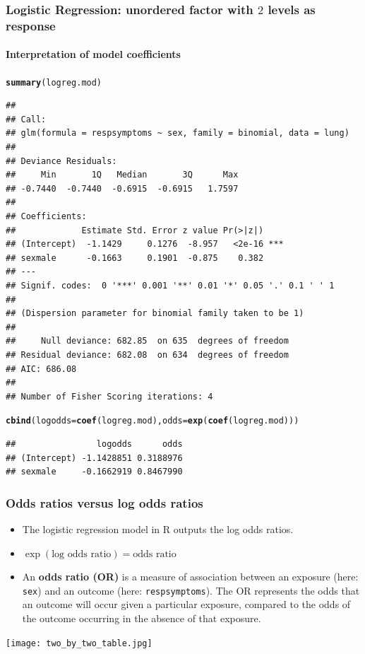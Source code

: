 \documentclass{beamer}\usepackage[]{graphicx}\usepackage[]{color}
\makeatletter
\newcommand{\hlstd}[1]{\textcolor[rgb]{0.345,0.345,0.345}{#1}}%
\newcommand{\hlkwc}[1]{\textcolor[rgb]{0.333,0.667,0.333}{#1}}%
\newcommand{\hlkwd}[1]{\textcolor[rgb]{0.737,0.353,0.396}{\textbf{#1}}}%
\newenvironment{kframe}{%
 \def\at@end@of@kframe{}%
 \ifinner\ifhmode%
  \def\at@end@of@kframe{\end{minipage}}%
  \begin{minipage}{\columnwidth}%
 \fi\fi%
 \def\FrameCommand##1{\hskip\@totalleftmargin \hskip-\fboxsep
 \colorbox{shadecolor}{##1}\hskip-\fboxsep
     \hskip-\linewidth \hskip-\@totalleftmargin \hskip\columnwidth}%
 \MakeFramed {\advance\hsize-\width
   \@totalleftmargin\z@ \linewidth\hsize
   \@setminipage}}%
 {\par\unskip\endMakeFramed%
 \at@end@of@kframe}
\newenvironment{knitrout}{}{} %
\makeatother
\begin{document}
{{{
\begin{frame}[fragile]
\frametitle{Logistic Regression: unordered factor with $2$ levels as response}
\framesubtitle{Interpretation of model coefficients}
\begin{knitrout}\tiny
{}\color{fgcolor}\begin{kframe}
\begin{alltt}
\hlkwd{summary}\hlstd{(logreg.mod)}
\end{alltt}
\begin{verbatim}
## 
## Call:
## glm(formula = respsymptoms ~ sex, family = binomial, data = lung)
## 
## Deviance Residuals: 
##     Min       1Q   Median       3Q      Max  
## -0.7440  -0.7440  -0.6915  -0.6915   1.7597  
## 
## Coefficients:
##             Estimate Std. Error z value Pr(>|z|)    
## (Intercept)  -1.1429     0.1276  -8.957   <2e-16 ***
## sexmale      -0.1663     0.1901  -0.875    0.382    
## ---
## Signif. codes:  0 '***' 0.001 '**' 0.01 '*' 0.05 '.' 0.1 ' ' 1
## 
## (Dispersion parameter for binomial family taken to be 1)
## 
##     Null deviance: 682.85  on 635  degrees of freedom
## Residual deviance: 682.08  on 634  degrees of freedom
## AIC: 686.08
## 
## Number of Fisher Scoring iterations: 4
\end{verbatim}
\begin{alltt}
\hlkwd{cbind}\hlstd{(}\hlkwc{logodds} \hlstd{=} \hlkwd{coef}\hlstd{(logreg.mod),} \hlkwc{odds} \hlstd{=} \hlkwd{exp}\hlstd{(}\hlkwd{coef}\hlstd{(logreg.mod)))}
\end{alltt}
\begin{verbatim}
##                logodds      odds
## (Intercept) -1.1428851 0.3188976
## sexmale     -0.1662919 0.8467990
\end{verbatim}
\end{kframe}
\end{knitrout}
\end{frame}

\usebackgroundtemplate{}
\begin{frame}[fragile]
\frametitle{Odds ratios versus log odds ratios}
\begin{itemize}
\setlength\itemsep{1.2em}
\item The logistic regression model in R outputs the log odds ratios.
\item $\exp(\text{log odds ratio}) = \text{odds ratio}$
\item An \textbf{odds ratio (OR)} is a measure of association between an
exposure (here: \texttt{sex}) and an outcome (here: \texttt{respsymptoms}). The OR represents the odds that an outcome will occur given a particular exposure, compared to the odds of the outcome occurring in the absence of that exposure.
\end{itemize}
\begin{center}
\texttt{[image: two\_by\_two\_table.jpg]}
\end{center}
\end{frame}

}}}
\end{document}
